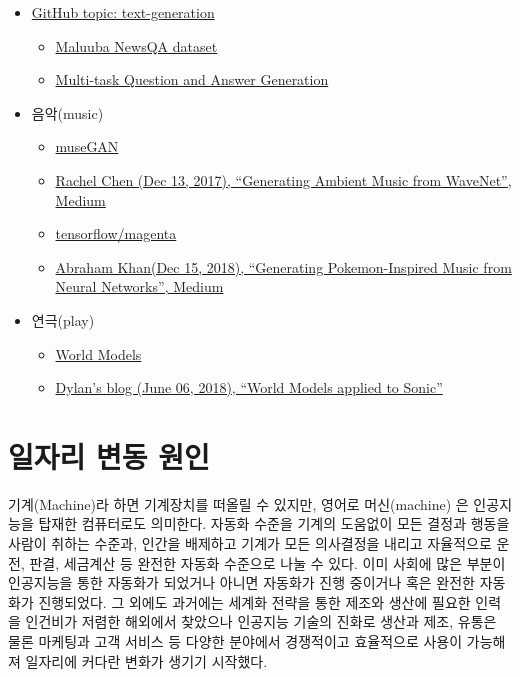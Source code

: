 \documentclass[smallextended]{svjour3}       %
\providecommand{\tightlist}{%
  \setlength{\itemsep}{0pt}\setlength{\parskip}{0pt}}
\begin{document}
\begin{itemize}
\tightlist
\item
  \href{https://github.com/topics/text-generation}{GitHub topic:
  text-generation}

  \begin{itemize}
  \tightlist
  \item
    \href{https://github.com/Maluuba/newsqa}{Maluuba NewsQA dataset}
  \item
    \href{https://github.com/Maluuba/qgen-workshop}{Multi-task Question
    and Answer Generation}
  \end{itemize}
\item
  음악(music)

  \begin{itemize}
  \tightlist
  \item
    \href{https://salu133445.github.io/musegan/}{museGAN}
  \item
    \href{https://medium.com/@rachelchen_49210/generating-ambient-noise-from-wavenet-95aa7f0a8f77}{Rachel
    Chen (Dec 13, 2017), ``Generating Ambient Music from WaveNet'',
    Medium}
  \item
    \href{https://github.com/tensorflow/magenta}{tensorflow/magenta}
  \item
    \href{https://towardsdatascience.com/generating-pokemon-inspired-music-from-neural-networks-bc240014132}{Abraham
    Khan(Dec 15, 2018), ``Generating Pokemon-Inspired Music from Neural
    Networks'', Medium}
  \end{itemize}
\item
  연극(play)

  \begin{itemize}
  \tightlist
  \item
    \href{https://worldmodels.github.io/}{World Models}
  \item
    \href{https://dylandjian.github.io/world-models/}{Dylan's blog (June
    06, 2018), ``World Models applied to Sonic''}
  \end{itemize}
\end{itemize}

\hypertarget{automation-job-statistics}{%
\section{일자리 변동 원인}\label{automation-job-statistics}}

기계(Machine)라 하면 기계장치를 떠올릴 수 있지만, 영어로 머신(machine)
은 인공지능을 탑재한 컴퓨터로도 의미한다. 자동화 수준을 기계의 도움없이
모든 결정과 행동을 사람이 취하는 수준과, 인간을 배제하고 기계가 모든
의사결정을 내리고 자율적으로 운전, 판결, 세금계산 등 완전한 자동화
수준으로 나눌 수 있다\cite{cummings2014man}. 이미 사회에 많은 부분이
인공지능을 통한 자동화가 되었거나 아니면 자동화가 진행 중이거나 혹은
완전한 자동화가 진행되었다. 그 외에도 과거에는 세계화 전략을 통한 제조와
생산에 필요한 인력을 인건비가 저렴한 해외에서 찾았으나 인공지능 기술의
진화로 생산과 제조, 유통은 물론 마케팅과 고객 서비스 등 다양한 분야에서
경쟁적이고 효율적으로 사용이 가능해져 일자리에 커다란 변화가 생기기
시작했다.
\end{document}

